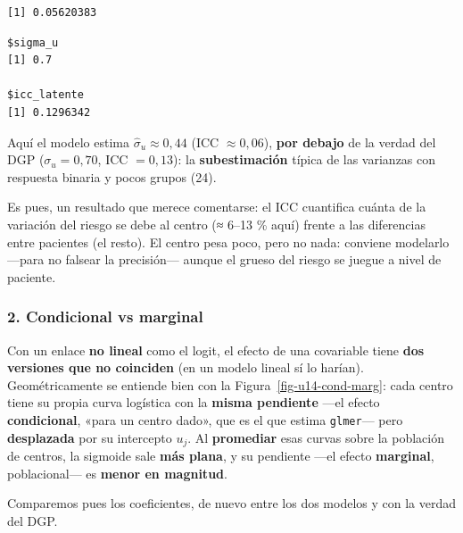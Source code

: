 \documentclass[
  letterpaper,
  DIV=11,
  numbers=noendperiod]{scrartcl}
\newenvironment{Shaded}{\begin{snugshade}}{\end{snugshade}}
\newcommand{\CommentTok}[1]{\textcolor[rgb]{0.37,0.37,0.37}{#1}}
\newcommand{\FunctionTok}[1]{\textcolor[rgb]{0.28,0.35,0.67}{#1}}
\newcommand{\NormalTok}[1]{\textcolor[rgb]{0.00,0.23,0.31}{#1}}
\newcommand{\SpecialCharTok}[1]{\textcolor[rgb]{0.37,0.37,0.37}{#1}}
\newcommand{\StringTok}[1]{\textcolor[rgb]{0.13,0.47,0.30}{#1}}
\begin{document}
\begin{verbatim}
[1] 0.05620383
\end{verbatim}

\begin{Shaded}
\end{Shaded}

\begin{verbatim}
$sigma_u
[1] 0.7

$icc_latente
[1] 0.1296342
\end{verbatim}

Aquí el modelo estima \(\hat\sigma_u\approx0{,}44\) (ICC
\(\approx0{,}06\)), \textbf{por debajo} de la verdad del DGP
(\(\sigma_u=0{,}70\), ICC \(=0{,}13\)): la \textbf{subestimación} típica
de las varianzas con respuesta binaria y pocos grupos (24).

Es pues, un resultado que merece comentarse: el ICC cuantifica cuánta de
la variación del riesgo se debe al centro (≈ 6--13 \% aquí) frente a las
diferencias entre pacientes (el resto). El centro pesa poco, pero no
nada: conviene modelarlo ---para no falsear la precisión--- aunque el
grueso del riesgo se juegue a nivel de paciente.

\hypertarget{condicional-vs-marginal}{%
\subsubsection{2. Condicional vs
marginal}\label{condicional-vs-marginal}}

Con un enlace \textbf{no lineal} como el logit, el efecto de una
covariable tiene \textbf{dos versiones que no coinciden} (en un modelo
lineal sí lo harían). Geométricamente se entiende bien con la
Figura~\ref{fig-u14-cond-marg}: cada centro tiene su propia curva
logística con la \textbf{misma pendiente} ---el efecto
\textbf{condicional}, «para un centro dado», que es el que estima
\texttt{glmer}--- pero \textbf{desplazada} por su intercepto \(u_j\). Al
\textbf{promediar} esas curvas sobre la población de centros, la
sigmoide sale \textbf{más plana}, y su pendiente ---el efecto
\textbf{marginal}, poblacional--- es \textbf{menor en magnitud}.

Comparemos pues los coeficientes, de nuevo entre los dos modelos y con
la verdad del DGP.
\end{document}
